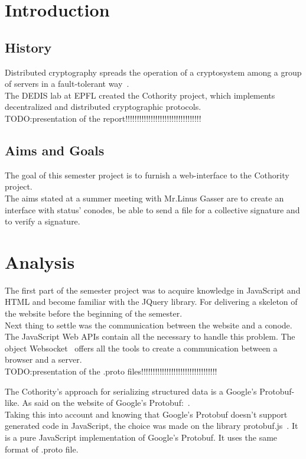 \documentclass[11pt, a4paper, twoside, openright]{book} %
\begin{document}


\tableofcontents
\newpage

\chapter{Introduction}
\section{History}
Distributed cryptography spreads the operation of a cryptosystem among a group
of servers in a fault-tolerant way~\cite{definition}.\\
The DEDIS lab at EPFL created the Cothority project, which implements decentralized
and distributed cryptographic protocols.\\

TODO:presentation of the report!!!!!!!!!!!!!!!!!!!!!!!!!!!!!!!!!

\section{Aims and Goals}
The goal of this semester project is to furnish a web-interface to the Cothority
project.\\
The aims stated at a summer meeting with Mr.Linus Gasser are to create an
interface with status' conodes, be able to send a file for a collective signature
and to verify a signature.\\


\chapter{Analysis}
The first part of the semester project was to acquire knowledge in JavaScript and
HTML and become familiar with the JQuery library. For delivering a skeleton of
the website before the beginning of the semester.\\
Next thing to settle was the communication between the website and a conode.
The JavaScript Web APIs contain all the necessary to handle this problem.
The object Websocket~\cite{websocketPage} offers all the tools to create a
communication between a browser and a server.\\

TODO:presentation of the .proto files!!!!!!!!!!!!!!!!!!!!!!!!!!!!!!!!!


The Cothority's approach for serializing structured data is a Google's Protobuf-like.
As said on the website of Google's Protobuf:~\cite{protobufDefi}.\\
Taking this into account and knowing that Google's Protobuf doesn't support generated
code in JavaScript, the choice was made on the library protobuf.js~\cite{protobufjs}.
It is a pure JavaScript implementation of Google's Protobuf. It uses the same format
of .proto file.
\end{document}
